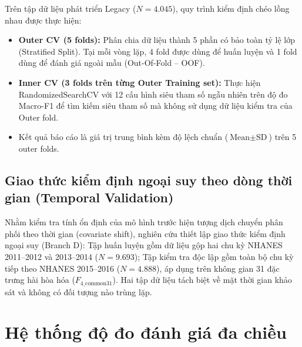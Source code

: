 Trên tập dữ liệu phát triển Legacy ($N = 4.045$), quy trình kiểm định chéo lồng nhau được thực hiện:
\begin{itemize}
    \item \textbf{Outer CV (5 folds):} Phân chia dữ liệu thành 5 phần có bảo toàn tỷ lệ lớp (Stratified Split). Tại mỗi vòng lặp, 4 fold được dùng để huấn luyện và 1 fold dùng để đánh giá ngoài mẫu (Out-Of-Fold -- OOF).
    \item \textbf{Inner CV (3 folds trên từng Outer Training set):} Thực hiện RandomizedSearchCV với 12 cấu hình siêu tham số ngẫu nhiên trên độ đo Macro-F1 để tìm kiếm siêu tham số mà không sử dụng dữ liệu kiểm tra của Outer fold.
    \item Kết quả báo cáo là giá trị trung bình kèm độ lệch chuẩn ($\text{Mean} \pm \text{SD}$) trên 5 outer folds.
\end{itemize}

\subsection{Giao thức kiểm định ngoại suy theo dòng thời gian (Temporal Validation)}
\label{subsec:temporal-protocol}

Nhằm kiểm tra tính ổn định của mô hình trước hiện tượng dịch chuyển phân phối theo thời gian (covariate shift), nghiên cứu thiết lập giao thức kiểm định ngoại suy (Branch D): Tập huấn luyện gồm dữ liệu gộp hai chu kỳ NHANES 2011--2012 và 2013--2014 ($N = 9.693$); Tập kiểm tra độc lập gồm toàn bộ chu kỳ tiếp theo NHANES 2015--2016 ($N = 4.888$), áp dụng trên không gian 31 đặc trưng hài hòa hóa ($F_{4\_\text{common31}}$). Hai tập dữ liệu tách biệt về mặt thời gian khảo sát và không có đối tượng nào trùng lặp.

\section{Hệ thống độ đo đánh giá đa chiều}
\label{sec:he-thong-do-do}

